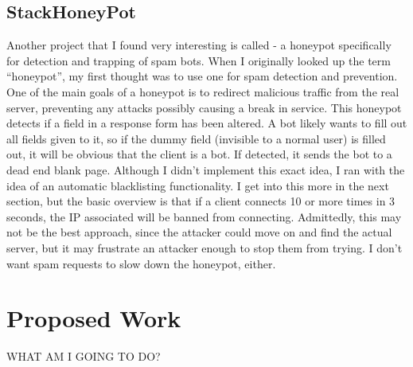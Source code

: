 \documentclass[12pt]{article}
\begin{document}
\subsection{StackHoneyPot}
Another project that I found very interesting is called  - a honeypot specifically for detection and trapping of spam bots.
When I originally looked up the term ``honeypot'', my first thought was to use one for spam detection and prevention.
One of the main goals of a honeypot is to redirect malicious traffic from the real server, preventing any attacks possibly causing a break in service.
This honeypot detects if a field in a response form has been altered.
A bot likely wants to fill out all fields given to it, so if the dummy field (invisible to a normal user) is filled out, it will be obvious that the client is a bot.
If detected, it sends the bot to a dead end blank page.
Although I didn't implement this exact idea, I ran with the idea of an automatic blacklisting functionality.
I get into this more in the next section, but the basic overview is that if a client connects 10 or more times in 3 seconds, the IP associated will be banned from connecting.
Admittedly, this may not be the best approach, since the attacker could move on and find the actual server, but it may frustrate an attacker enough to stop them from trying.
I don't want spam requests to slow down the honeypot, either.


\section{Proposed Work}
WHAT AM I GOING TO DO?

\end{document}
